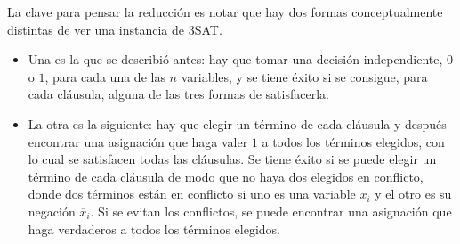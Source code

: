 \documentclass[12pt, spanish, oneside, openany]{book}
\newcommand{\nega}[1]{\overline{#1}} %
\theoremstyle{uprightplain}
\theoremstyle{definition}
\theoremstyle{remark}
\theoremstyle{definition}
\begin{document}
La clave para pensar la reducción es notar que hay dos formas conceptualmente distintas de ver una instancia de 3SAT.
\begin{itemize}
    \item Una es la que se describió antes: hay que tomar una decisión independiente, $0$ o $1$, para cada una de las $n$ variables, y se tiene éxito si se consigue, para cada cláusula, alguna de las tres formas de satisfacerla.
    \item La otra es la siguiente: hay que elegir un término de cada cláusula y después encontrar una asignación que haga valer $1$ a todos los términos elegidos, con lo cual se satisfacen todas las cláusulas. Se tiene éxito si se puede elegir un término de cada cláusula de modo que no haya dos elegidos en conflicto, donde dos términos están en conflicto si uno es una variable $x_i$ y el otro es su negación $\nega{x}_i$. Si se evitan los conflictos, se puede encontrar una asignación que haga verdaderos a todos los términos elegidos.
\end{itemize}
\end{document}
